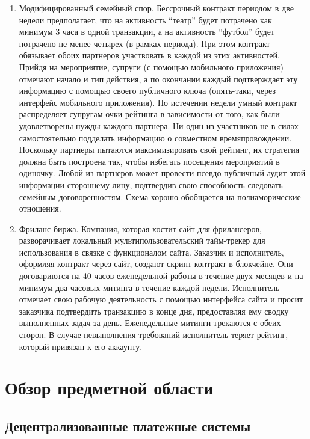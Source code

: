 \documentclass[specification,annotation]{itmo-student-thesis}
\begin{document}
\begin{enumerate}
  \item Модифицированный семейный спор. Бессрочный контракт периодом в
    две недели предполагает, что на активность ``театр'' будет
    потрачено как минимум 3 часа в одной транзакции, а на активность
    ``футбол'' будет потрачено не менее четырех (в рамках
    периода). При этом контракт обязывает обоих партнеров участвовать
    в каждой из этих активностей. Прийдя на мероприятие, супруги (с
    помощью мобильного приложения) отмечают начало и тип действия, а
    по окончании каждый подтверждает эту информацию с помощью своего
    публичного ключа (опять-таки, через интерфейс мобильного
    приложения). По истечении недели умный контракт распределяет
    супругам очки рейтинга в зависимости от того, как были
    удовлетворены нужды каждого партнера. Ни один из участников не в
    силах самостоятельно подделать информацию о совместном
    времяпровождении. Поскольку партнеры пытаются максимизировать свой
    рейтинг, их стратегия должна быть построена так, чтобы избегать
    посещения мероприятий в одиночку. Любой из партнеров может
    провести псевдо-публичный аудит этой информации стороннему лицу,
    подтвердив свою способность следовать семейным
    договоренностям. Схема хорошо обобщается на полиаморические
    отношения.
  \item Фриланс биржа. Компания, которая хостит сайт для фрилансеров,
    разворачивает локальный мультипользовательский тайм-трекер для
    использования в связке с функционалом сайта. Заказчик и
    исполнитель, оформляя контракт через сайт, создают скрипт-контракт
    в блокчейне. Они договариются на 40 часов еженедельной работы в
    течение двух месяцев и на минимум два часовых митинга в течение
    каждой недели. Исполнитель отмечает свою рабочую деятельность с
    помощью интерфейса сайта и просит заказчика подтвердить транзакцию
    в конце дня, предоставляя ему сводку выполненных задач за
    день. Еженедельные митинги трекаются с обеих сторон. В случае
    невыполнения требований исполнитель теряет рейтинг, который
    привязан к его аккаунту.
\end{enumerate}

\chapter{Обзор предметной области}

\section{Децентрализованные платежные системы}
\end{document}
